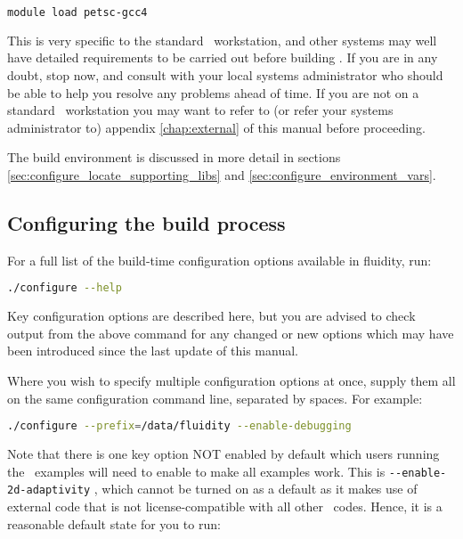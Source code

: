 \begin{lstlisting}[language=Bash]
module load petsc-gcc4
\end{lstlisting}

This is very specific to the standard \fluidity\ workstation, and other systems
may well have detailed requirements to be carried out before building
\fluidity. If you are in any doubt, stop now, and consult with your local
systems administrator who should be able to help you resolve any problems ahead
of time. If you are not on a standard \fluidity\ workstation you may want to
refer to (or refer your systems administrator to) appendix \ref{chap:external}
of this manual before proceeding.

The build environment is discussed in more detail in sections
\ref{sec:configure_locate_supporting_libs} and
\ref{sec:configure_environment_vars}.

\subsection{Configuring the build process}
\label{sec:configuring_the_build_process}

For a full list of the build-time configuration options available in fluidity,
run:

\begin{lstlisting}[language=Bash]
./configure --help
\end{lstlisting}

Key configuration options are described here, but you are advised to check
output from the above command for any changed or new options which may have
been introduced since the last update of this manual.

Where you wish to specify multiple configuration options at once, supply them
all on the same configuration command line, separated by spaces. For example:

\begin{lstlisting}[language=Bash]
./configure --prefix=/data/fluidity --enable-debugging
\end{lstlisting}

Note that there is one key option NOT enabled by default which users running
the \fluidity\ examples will need to enable to make all examples work. This is 
\lstinline[language=Bash]+--enable-2d-adaptivity+ , which cannot be turned on
as a default as it makes use of external code that is not license-compatible
with all other \fluidity\ codes. Hence, it is a reasonable default state for
you to run:

